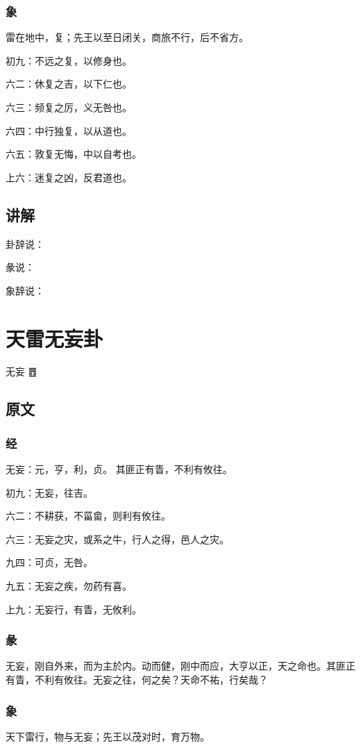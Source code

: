 \documentclass[12pt,oneside]{book}
\begin{document}
\subsection{象}
雷在地中，复；先王以至日闭关，商旅不行，后不省方。

初九：不远之复，以修身也。

六二：休复之吉，以下仁也。

六三：频复之厉，义无咎也。

六四：中行独复，以从道也。

六五：敦复无悔，中以自考也。

上六：迷复之凶，反君道也。

\section{讲解}
卦辞说：

彖说：

象辞说：

\chapter{天雷无妄卦}
无妄 {\Large ䷘}

\section{原文}
\subsection{经}
无妄：元，亨，利，贞。 其匪正有眚，不利有攸往。

初九：无妄，往吉。

六二：不耕获，不菑畲，则利有攸往。

六三：无妄之灾，或系之牛，行人之得，邑人之灾。

九四：可贞，无咎。

九五：无妄之疾，勿药有喜。

上九：无妄行，有眚，无攸利。

\subsection{彖}
无妄，刚自外来，而为主於内。动而健，刚中而应，大亨以正，天之命也。其匪正有眚，不利有攸往。无妄之往，何之矣？天命不祐，行矣哉？
\subsection{象}
天下雷行，物与无妄；先王以茂对时，育万物。
\end{document}
